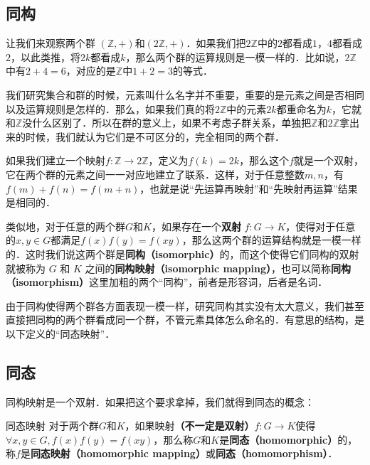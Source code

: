 

\subsection{同构}

让我们来观察两个群 $(\mathbb{Z}, +)$和$(2\mathbb{Z},+)$．如果我们把$2\mathbb{Z}$中的$2$都看成$1$，$4$都看成$2$，以此类推，将$2k$都看成$k$，那么两个群的运算规则是一模一样的．比如说，$2\mathbb{Z}$中有$2+4=6$，对应的是$\mathbb{Z}$中$1+2=3$的等式．

我们研究集合和群的时候，元素叫什么名字并不重要，重要的是元素之间是否相同以及运算规则是怎样的．那么，如果我们真的将$2\mathbb{Z}$中的元素$2k$都重命名为$k$，它就和$\mathbb{Z}$没什么区别了．所以在群的意义上，如果不考虑子群关系，单独把$\mathbb{Z}$和$2\mathbb{Z}$拿出来的时候，我们就认为它们是不可区分的，完全相同的两个群．

如果我们建立一个映射$f:\mathbb{Z}\rightarrow2\mathbb{Z}$，定义为$f(k)=2k$，那么这个$f$就是一个双射，它在两个群的元素之间一一对应地建立了联系．这样，对于任意整数$m, n$，有$f(m)+f(n)=f(m+n)$，也就是说“先运算再映射”和“先映射再运算”结果是相同的．

类似地，对于任意的两个群$G$和$K$，如果存在一个\textbf{双射} $f:G\rightarrow K$，使得对于任意的$x, y\in G$都满足$f(x)f(y)=f(xy)$，那么这两个群的运算结构就是一模一样的．这时我们说这两个群是\textbf{同构（isomorphic）}的，而这个使得它们同构的双射就被称为 $G$ 和 $K$ 之间的\textbf{同构映射（isomorphic mapping）}，也可以简称\textbf{同构（isomorphism）}这里加粗的两个“同构”，前者是形容词，后者是名词．

由于同构使得两个群各方面表现一模一样，研究同构其实没有太大意义，我们甚至直接把同构的两个群看成同一个群，不管元素具体怎么命名的．有意思的结构，是以下定义的“同态映射”．

\subsection{同态}

同构映射是一个双射．如果把这个要求拿掉，我们就得到同态的概念：

\begin{definition}{同态映射}\label{Group2_def1}
对于两个群$G$和$K$，如果映射\textbf{（不一定是双射）}$f:G\rightarrow K$使得$\forall x, y\in G, f(x)f(y)=f(xy)$，那么称$G$和$K$是\textbf{同态（homomorphic）}的，称$f$是\textbf{同态映射（homomorphic mapping）}或\textbf{同态（homomorphism）}．
\end{definition}

